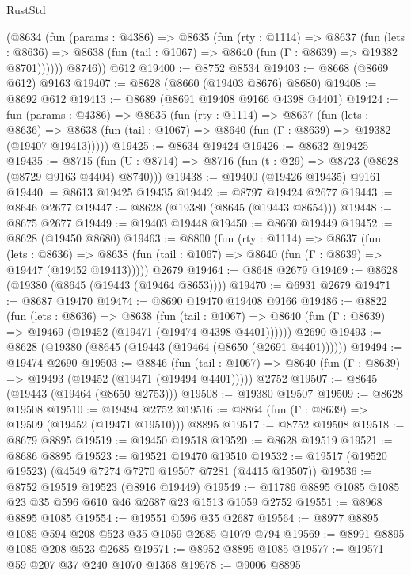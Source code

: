\begin{lexlean}{RustStd}
\begin{coremodule}
        (@8634
          (fun (params : @4386) =>
          @8635
            (fun (rty : @1114) =>
            @8637
              (fun (lets : @8636) =>
              @8638 (fun (tail : @1067) => @8640 (fun (Γ : @8639) => @19382 @8701))))))
        @8746))
    @612
@19400 := @8752 @8534
@19403 := @8668 (@8669 @612) @9163
@19407 := @8628 (@8660 (@19403 @8676) @8680)
@19408 := @8692 @612
@19413 := @8689 (@8691 @19408 @9166 @4398 @4401)
@19424 := fun (params : @4386) =>
  @8635
    (fun (rty : @1114) =>
    @8637
      (fun (lets : @8636) =>
      @8638 (fun (tail : @1067) => @8640 (fun (Γ : @8639) => @19382 (@19407 @19413)))))
@19425 := @8634 @19424
@19426 := @8632 @19425
@19435 := @8715
    (fun (U : @8714) => @8716 (fun (t : @29) => @8723 (@8628 (@8729 @9163 @4404) @8740)))
@19438 := @19400 (@19426 @19435) @9161
@19440 := @8613 @19425 @19435
@19442 := @8797 @19424 @2677
@19443 := @8646 @2677
@19447 := @8628 (@19380 (@8645 (@19443 @8654)))
@19448 := @8675 @2677
@19449 := @19403 @19448
@19450 := @8660 @19449
@19452 := @8628 (@19450 @8680)
@19463 := @8800
    (fun (rty : @1114) =>
    @8637
      (fun (lets : @8636) =>
      @8638 (fun (tail : @1067) => @8640 (fun (Γ : @8639) => @19447 (@19452 @19413)))))
    @2679
@19464 := @8648 @2679
@19469 := @8628 (@19380 (@8645 (@19443 (@19464 @8653))))
@19470 := @6931 @2679
@19471 := @8687 @19470
@19474 := @8690 @19470 @19408 @9166
@19486 := @8822
    (fun (lets : @8636) =>
    @8638
      (fun (tail : @1067) =>
      @8640 (fun (Γ : @8639) => @19469 (@19452 (@19471 (@19474 @4398 @4401))))))
    @2690
@19493 := @8628 (@19380 (@8645 (@19443 (@19464 (@8650 (@2691 @4401))))))
@19494 := @19474 @2690
@19503 := @8846
    (fun (tail : @1067) => @8640 (fun (Γ : @8639) => @19493 (@19452 (@19471 (@19494 @4401)))))
    @2752
@19507 := @8645 (@19443 (@19464 (@8650 @2753)))
@19508 := @19380 @19507
@19509 := @8628 @19508
@19510 := @19494 @2752
@19516 := @8864 (fun (Γ : @8639) => @19509 (@19452 (@19471 @19510))) @8895
@19517 := @8752 @19508
@19518 := @8679 @8895
@19519 := @19450 @19518
@19520 := @8628 @19519
@19521 := @8686 @8895
@19523 := @19521 @19470 @19510
@19532 := @19517 (@19520 @19523) (@4549 @7274 @7270 @19507 @7281 (@4415 @19507))
@19536 := @8752 @19519 @19523 (@8916 @19449)
@19549 := @11786 @8895 @1085 @1085 @23 @35 @596 @610 @46 @2687 @23 @1513 @1059 @2752
@19551 := @8968 @8895 @1085
@19554 := @19551 @596 @35 @2687
@19564 := @8977 @8895 @1085 @594 @208 @523 @35 @1059 @2685 @1079 @794
@19569 := @8991 @8895 @1085 @208 @523 @2685
@19571 := @8952 @8895 @1085
@19577 := @19571 @59 @207 @37 @240 @1070 @1368
@19578 := @9006 @8895

\end{coremodule}
\end{lexlean}
